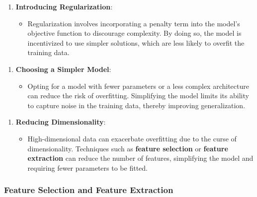 \documentclass{article}
\providecommand{\tightlist}{%
      \setlength{\itemsep}{0pt}\setlength{\parskip}{0pt}}
\begin{document}
\begin{enumerate}
\def\labelenumi{\arabic{enumi}.}
\setcounter{enumi}{1}
\tightlist
\item
  \textbf{Introducing Regularization}:

  \begin{itemize}
  \tightlist
  \item
    Regularization involves incorporating a penalty term into the
    model's objective function to discourage complexity. By doing so,
    the model is incentivized to use simpler solutions, which are less
    likely to overfit the training data.
  \end{itemize}
\end{enumerate}

\begin{enumerate}
\def\labelenumi{\arabic{enumi}.}
\setcounter{enumi}{2}
\tightlist
\item
  \textbf{Choosing a Simpler Model}:

  \begin{itemize}
  \tightlist
  \item
    Opting for a model with fewer parameters or a less complex
    architecture can reduce the risk of overfitting. Simplifying the
    model limits its ability to capture noise in the training data,
    thereby improving generalization.
  \end{itemize}
\end{enumerate}

\begin{enumerate}
\def\labelenumi{\arabic{enumi}.}
\setcounter{enumi}{3}
\tightlist
\item
  \textbf{Reducing Dimensionality}:

  \begin{itemize}
  \tightlist
  \item
    High-dimensional data can exacerbate overfitting due to the curse of
    dimensionality. Techniques such as \textbf{feature selection} or
    \textbf{feature extraction} can reduce the number of features,
    simplifying the model and requiring fewer parameters to be fitted.
  \end{itemize}
\end{enumerate}

    \subsubsection{Feature Selection and Feature
Extraction}\label{feature-selection-and-feature-extraction}
\end{document}
